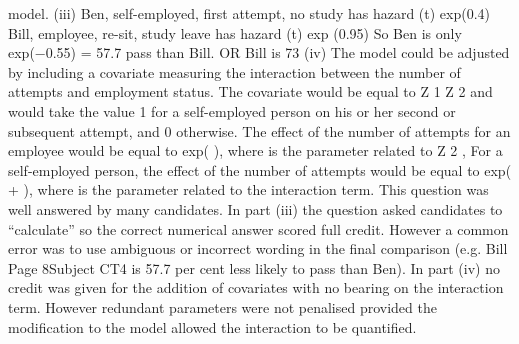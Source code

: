 model.
(iii)
Ben, self-employed, first attempt, no study has hazard  (t) exp(0.4)
Bill, employee, re-sit, study leave has hazard  (t) exp (0.95)
So Ben is only exp(−0.55) = 57.7%
pass than Bill.
OR
Bill is 73%
(iv)
The model could be adjusted by including a covariate measuring the interaction
between the number of attempts and employment status.
The covariate would be equal to Z 1 Z 2 and would take the value 1 for a self-employed
person on his or her second or subsequent attempt, and 0 otherwise.
The effect of the number of attempts for an employee would be equal to exp( ),
where  is the parameter related to Z 2 , For a self-employed person, the effect of the
number of attempts would be equal to exp( +  ), where  is the parameter related
to the interaction term.
This question was well answered by many candidates. In part (iii) the question asked
candidates to “calculate” so the correct numerical answer scored full credit. However a
common error was to use ambiguous or incorrect wording in the final comparison (e.g. Bill
Page 8Subject CT4 %
is 57.7 per cent less likely to pass than Ben). In part (iv) no credit was given for the addition
of covariates with no bearing on the interaction term. However redundant parameters were
not penalised provided the modification to the model allowed the interaction to be quantified.
